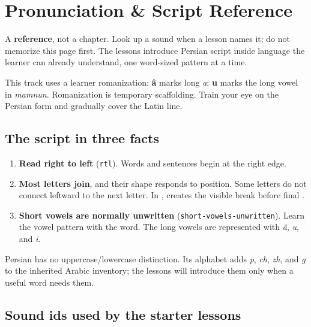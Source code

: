 
\chapter*{Pronunciation \& Script Reference}

A \textbf{reference}, not a chapter. Look up a sound when a lesson names it; do not memorize this page first. The lessons introduce Persian script inside language the learner can already understand, one word-sized pattern at a time.

This track uses a learner romanization: \textbf{â} marks long \emph{a}; \textbf{u} marks the long vowel in \emph{mamnun}. Romanization is temporary scaffolding. Train your eye on the Persian form and gradually cover the Latin line.

\section*{The script in three facts}

\begin{enumerate}
\raggedright
\setlength{\itemsep}{0.35em}
  \item \textbf{Read right to left} (\texttt{rtl}). Words and sentences begin at the right edge.
  \item \textbf{Most letters join}, and their shape responds to position. Some letters do not connect leftward to the next letter. In \textbf{}, \textbf{} creates the visible break before final \textbf{}.
  \item \textbf{Short vowels are normally unwritten} (\texttt{short-vowels-unwritten}). Learn the vowel pattern with the word. The long vowels are represented with \textbf{} \emph{â}, \textbf{} \emph{u}, and \textbf{} \emph{i}.
\end{enumerate}

Persian has no uppercase/lowercase distinction. Its alphabet adds \textbf{} \emph{p}, \textbf{} \emph{ch}, \textbf{} \emph{zh}, and \textbf{} \emph{g} to the inherited Arabic inventory; the lessons will introduce them only when a useful word needs them.

\section*{Sound ids used by the starter lessons}

